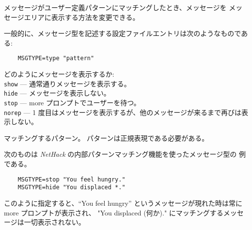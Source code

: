 メッセージがユーザー定義パターンにマッチングしたとき、メッセージを
メッセージエリアに表示する方法を変更できる。

一般的に、メッセージ型を記述する設定ファイルエントリは次のようなものである:
\begin{verbatim}
    MSGTYPE=type "pattern"
\end{verbatim}
\blist{}
\item[\ib{type}]
どのようにメッセージを表示するか:
\\
{\tt show}  --- 通常通りメッセージを表示する。\\
{\tt hide}  --- メッセージを表示しない。\\
{\tt stop}  --- more プロンプトでユーザーを待つ。\\
{\tt norep} --- 1 度目はメッセージを表示するが、他のメッセージが来るまで再びは表示しない。
\item[\ib{pattern}]
マッチングするパターン。
パターンは正規表現である必要がある。
\elist

次のものは {\it NetHack\/} の内部パターンマッチング機能を使ったメッセージ型の
例である。

\begin{verbatim}
    MSGTYPE=stop "You feel hungry."
    MSGTYPE=hide "You displaced *."
\end{verbatim}

このように指定すると、``You feel hungry'' というメッセージが現れた時は常に
more プロンプトが表示され、
"You displaced (何か)." にマッチングするメッセージは一切表示されない。

